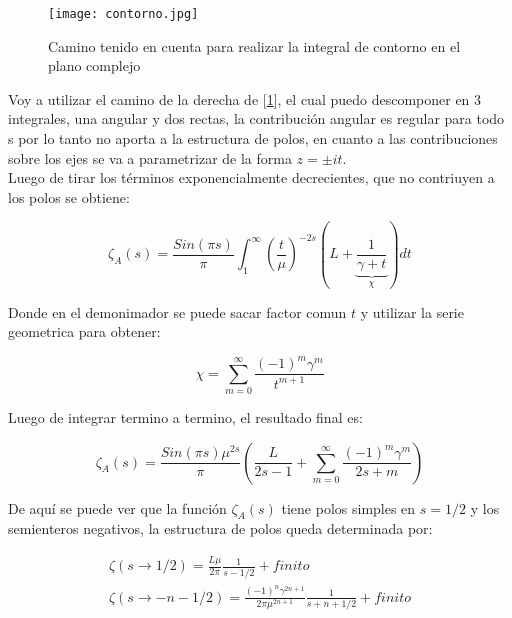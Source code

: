 \begin{figure}
\centering
\texttt{[image: contorno.jpg]}
\caption{Camino tenido en cuenta para realizar la integral de contorno en el plano complejo}
\label{fig:contorno}
\end{figure}




Voy a utilizar el camino de la derecha de [\ref{fig:contorno}], el cual puedo descomponer en 3 integrales, una angular y dos rectas, la contribución angular es regular para todo s por lo tanto no aporta a la estructura de polos, en cuanto a las contribuciones sobre los ejes se va a parametrizar de la forma $z = \pm i  t$. \\ 


	Luego de tirar los términos exponencialmente decrecientes, que no contriuyen a los polos se obtiene:

\begin{equation}
	\zeta _A (s) = 
    \frac{Sin(\pi s)}{ \pi } 
    \int _1 ^{\infty} 
    \left( \frac{t}{\mu}  \right)^{-2s}
    \left(
    	L + 
	    \underbrace
    	{
		\frac{1}{\gamma + t}   
		} _{\chi} 
	\right)
    dt 
\label{contorno}
\end{equation}

Donde en el demonimador se puede sacar factor comun $t$ y utilizar la serie geometrica para obtener:

\begin{equation}
    \chi =   \sum _{m=0} ^{\infty} \frac{(-1) ^{m} \gamma ^{m} }{t ^{m+1}}
\label{eq:chi}
\end{equation}

Luego de integrar termino a termino, el resultado final es:

\begin{equation}
    \zeta _A (s) = 
    \frac{Sin(\pi s) \mu ^{2s }}{\pi } 
    \left(
    \frac{L}{2s-1} + 
    \sum _{m=0} ^{\infty}
    \frac{(-1) ^{m} \gamma ^{m} }{2s+m}
    \right)
\label{eq.zeta.com}
\end{equation}

De aquí se puede ver que la función $\zeta _A (s)$ tiene polos simples en $s=1/2$ y los semienteros negativos, la estructura de polos queda determinada por:

\begin{equation}
\begin{array}{c}

\zeta(s \rightarrow 1/2) = \frac{L \mu }{2 \pi} \frac{1}{s-1/2} + finito\\
\zeta (s \rightarrow -n - 1/2)  = \frac{ (-1) ^n \gamma ^{2n+1}  }{2 \pi \mu ^{2n + 1}} \frac{1}{s + n + 1/2} + finito

\end{array}
\end{equation}


